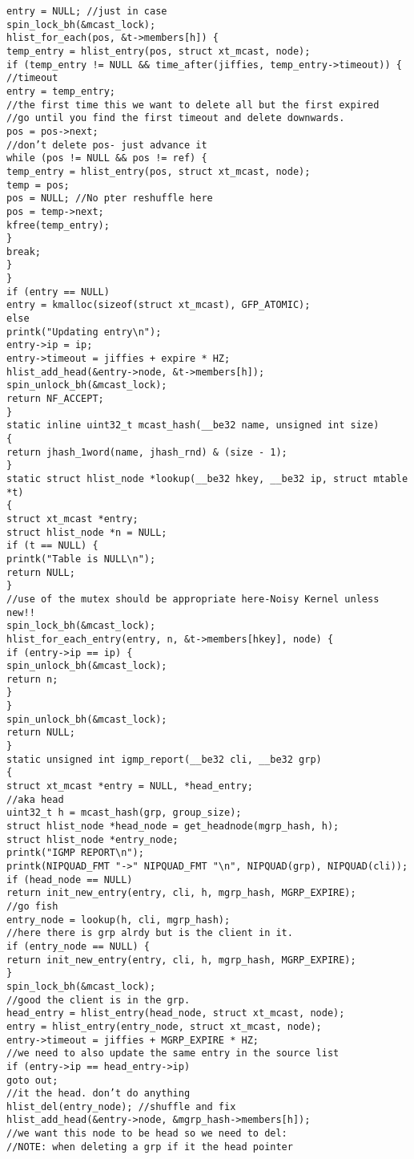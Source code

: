 \begin{verbatim}
entry = NULL; //just in case
spin_lock_bh(&mcast_lock);
hlist_for_each(pos, &t->members[h]) {
temp_entry = hlist_entry(pos, struct xt_mcast, node);
if (temp_entry != NULL && time_after(jiffies, temp_entry->timeout)) {
//timeout
entry = temp_entry;
//the first time this we want to delete all but the first expired
//go until you find the first timeout and delete downwards.
pos = pos->next;
//don’t delete pos- just advance it
while (pos != NULL && pos != ref) {
temp_entry = hlist_entry(pos, struct xt_mcast, node);
temp = pos;
pos = NULL; //No pter reshuffle here
pos = temp->next;
kfree(temp_entry);
}
break;
}
}
if (entry == NULL)
entry = kmalloc(sizeof(struct xt_mcast), GFP_ATOMIC);
else
printk("Updating entry\n");
entry->ip = ip;
entry->timeout = jiffies + expire * HZ;
hlist_add_head(&entry->node, &t->members[h]);
spin_unlock_bh(&mcast_lock);
return NF_ACCEPT;
}
static inline uint32_t mcast_hash(__be32 name, unsigned int size)
{
return jhash_1word(name, jhash_rnd) & (size - 1);
}
static struct hlist_node *lookup(__be32 hkey, __be32 ip, struct mtable *t)
{
struct xt_mcast *entry;
struct hlist_node *n = NULL;
if (t == NULL) {
printk("Table is NULL\n");
return NULL;
}
//use of the mutex should be appropriate here-Noisy Kernel unless new!!
spin_lock_bh(&mcast_lock);
hlist_for_each_entry(entry, n, &t->members[hkey], node) {
if (entry->ip == ip) {
spin_unlock_bh(&mcast_lock);
return n;
}
}
spin_unlock_bh(&mcast_lock);
return NULL;
}
static unsigned int igmp_report(__be32 cli, __be32 grp)
{
struct xt_mcast *entry = NULL, *head_entry;
//aka head
uint32_t h = mcast_hash(grp, group_size);
struct hlist_node *head_node = get_headnode(mgrp_hash, h);
struct hlist_node *entry_node;
printk("IGMP REPORT\n");
printk(NIPQUAD_FMT "->" NIPQUAD_FMT "\n", NIPQUAD(grp), NIPQUAD(cli));
if (head_node == NULL)
return init_new_entry(entry, cli, h, mgrp_hash, MGRP_EXPIRE);
//go fish
entry_node = lookup(h, cli, mgrp_hash);
//here there is grp alrdy but is the client in it.
if (entry_node == NULL) {
return init_new_entry(entry, cli, h, mgrp_hash, MGRP_EXPIRE);
}
spin_lock_bh(&mcast_lock);
//good the client is in the grp.
head_entry = hlist_entry(head_node, struct xt_mcast, node);
entry = hlist_entry(entry_node, struct xt_mcast, node);
entry->timeout = jiffies + MGRP_EXPIRE * HZ;
//we need to also update the same entry in the source list
if (entry->ip == head_entry->ip)
goto out;
//it the head. don’t do anything
hlist_del(entry_node); //shuffle and fix
hlist_add_head(&entry->node, &mgrp_hash->members[h]);
//we want this node to be head so we need to del:
//NOTE: when deleting a grp if it the head pointer

\end{verbatim}

